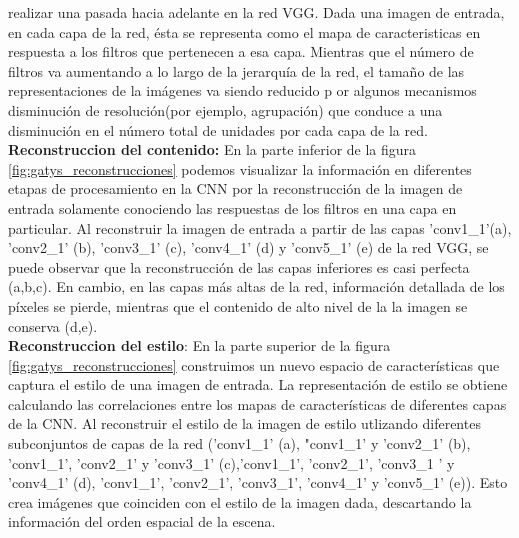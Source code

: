 \documentclass[a4paper,11pt,spanish]{book}
\begin{document}
      realizar una pasada hacia adelante en la red VGG. Dada una imagen de entrada, en cada capa de la red, ésta se representa como el mapa de caracteristicas en respuesta a los filtros
      que pertenecen a esa capa. Mientras que el número de filtros va aumentando a lo largo de la jerarquía de la red, el tamaño de las representaciones de la imágenes va siendo reducido p
      or algunos mecanismos disminución de resolución(por ejemplo, agrupación) que conduce a una disminución en el número total de unidades por cada capa de la red.\\
      \textbf{Reconstruccion del contenido:}
	En la parte inferior de la figura \ref{fig:gatys_reconstrucciones} podemos visualizar la información en diferentes etapas de procesamiento en la CNN por la reconstrucción 
	de la imagen de entrada solamente conociendo las respuestas de los filtros 
	en una capa en particular. Al reconstruir la imagen de entrada a partir de las capas 'conv1\_1'(a), 'conv2\_1' (b), 'conv3\_1' (c), 'conv4\_1' (d) y 'conv5\_1' (e) de la red VGG,  
	se puede observar que la reconstrucción de las capas inferiores es casi perfecta (a,b,c). En cambio, en las capas más altas de la red, información detallada de los píxeles se 
	pierde, mientras que el contenido de alto nivel  de la la imagen se conserva (d,e). \\
      \textbf{Reconstruccion del estilo}:
	En la parte superior de la figura \ref{fig:gatys_reconstrucciones} construimos un nuevo espacio de características que captura el estilo de una imagen de entrada. 
	La representación de estilo se obtiene calculando las correlaciones entre los mapas de características de diferentes capas de la CNN. Al reconstruir el estilo de la imagen de estilo  
	utlizando diferentes subconjuntos de capas de la red ('conv1\_1' (a), "conv1\_1' y 'conv2\_1' (b), 'conv1\_1', 'conv2\_1' y 'conv3\_1' (c),'conv1\_1', 'conv2\_1', 'conv3\_1 ' y 'conv4\_1' (d), 
	'conv1\_1', 'conv2\_1', 'conv3\_1', 'conv4\_1' y 'conv5\_1' (e)). 
	Esto crea imágenes que coinciden con el estilo de la imagen dada, descartando la información del orden espacial de la escena.
\end{document}
